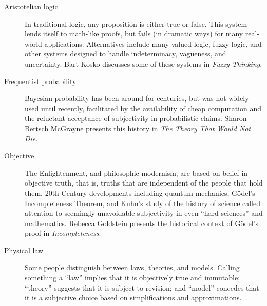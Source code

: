 \documentclass[12pt]{book}
\theoremstyle{exercise}
\newcommand{\myrightarrow}{\ensuremath \rightarrow}
\begin{document}
\begin{description}

\item[Aristotelian logic \myrightarrow~many-valued logic] In
  traditional logic, any proposition is either true or false.  This
  system lends itself to math-like proofs, but fails (in dramatic
  ways) for many real-world applications.  Alternatives include
  many-valued logic, fuzzy logic, and other systems designed to handle
  indeterminacy, vagueness, and uncertainty.  Bart
  Kosko discusses some of these systems in {\em Fuzzy Thinking}.


\item[Frequentist probability \myrightarrow~Bayesianism] Bayesian
  probability has been around for centuries, but was not widely used
  until recently, facilitated by the availability of cheap computation
  and the reluctant acceptance of subjectivity
  in probabilistic claims.  Sharon Bertsch McGrayne presents this
  history in {\em The Theory That Would Not Die}.


\item[Objective \myrightarrow~subjective] The Enlightenment, and
  philosophic modernism, are based on belief in objective truth, that
  is, truths that are independent of the people that hold them.  20th
  Century developments including quantum mechanics, G\"{o}del's
  Incompleteness Theorem, and Kuhn's study of the history of science
  called attention to seemingly unavoidable subjectivity in
  even ``hard sciences'' and mathematics.  Rebecca Goldstein presents
  the historical context of G\"{o}del's proof in {\it Incompleteness}.


\item[Physical law \myrightarrow~theory \myrightarrow~model] Some
  people distinguish between laws, theories, and models.  Calling
  something a ``law'' implies that it is objectively true and
  immutable; ``theory'' suggests that it is subject to revision; and
  ``model'' concedes that it is a subjective choice based on
  simplifications and approximations.  


\end{description}
\end{document}
